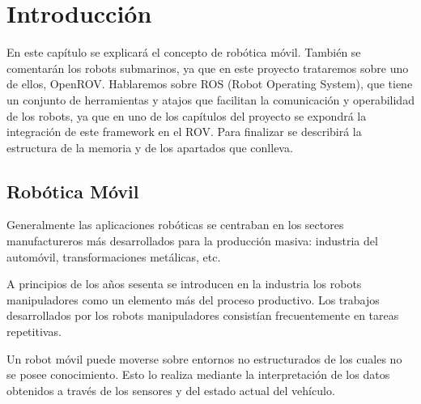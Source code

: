 \chapter{Introducción}

En este capítulo se explicará el concepto de robótica móvil\cite{RoboticaMovil}.
También se comentarán los robots submarinos, ya que en este proyecto trataremos sobre uno de ellos, OpenROV.
Hablaremos sobre ROS (Robot Operating System), que tiene un conjunto de herramientas y atajos que facilitan la comunicación y operabilidad de los robots, ya que en uno de los capítulos del proyecto se expondrá la integración de este framework en el ROV.
Para finalizar se describirá la estructura de la memoria y de los apartados que conlleva.

\section{Robótica Móvil}
\label{cap:roboticamovil}
Generalmente las aplicaciones robóticas se centraban en los sectores manufactureros más desarrollados para la producción masiva: industria del automóvil, transformaciones metálicas, etc.

A principios de los años sesenta se introducen en la industria los robots manipuladores como un elemento más del proceso productivo. Los trabajos desarrollados por los robots manipuladores consistían frecuentemente en tareas repetitivas.

Un robot móvil puede moverse sobre entornos no estructurados de los cuales no se posee conocimiento. Esto lo realiza mediante la interpretación de los datos obtenidos a través de los sensores y del estado actual del vehículo. 

